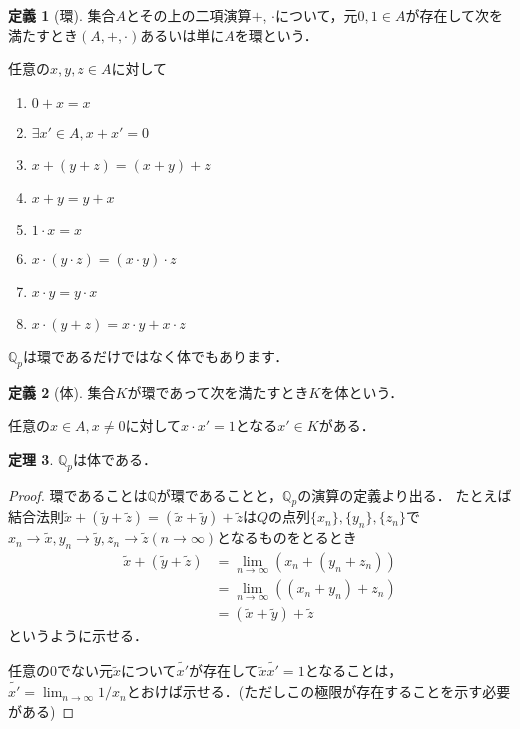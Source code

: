 \documentclass[uplatex]{jsarticle}
\newcommand{\Q}{\mathbb{Q}}
\theoremstyle{definition} %
\newtheorem{thm}{定理}
\newtheorem{defi}[thm]{定義}
\begin{document}
\begin{oframed}\begin{defi}[環]
集合$A$とその上の二項演算$+$, $\cdot$について，元$0, 1 \in A$が存在して次を満たすとき$(A, +, \cdot)$あるいは単に$A$を環という．

任意の$x, y, z \in A$に対して
\begin{enumerate}
\item $0 + x = x$
\item $\exists x'\in A, x + x' = 0$
\item $x + (y + z) = (x + y) + z$
\item $x + y = y + x$
\item $1 \cdot x = x$
\item $x \cdot (y \cdot z) = (x \cdot y) \cdot z$
\item $x \cdot y = y \cdot x$
\item $x \cdot (y + z) = x \cdot y + x \cdot z$
\end{enumerate}
\end{defi}\end{oframed}

$\Q_p$は環であるだけではなく体でもあります．

\begin{oframed}\begin{defi}[体]
集合$K$が環であって次を満たすとき$K$を体という．

任意の$x \in A, x \ne 0$に対して$x \cdot x' = 1$となる$x' \in K$がある．
\end{defi}\end{oframed}

\begin{oframed}\begin{thm}
$\Q_p$は体である．
\end{thm}\end{oframed}
\begin{proof}
環であることは$\Q$が環であることと，$\Q_p$の演算の定義より出る．
たとえば結合法則$\tilde{x} + (\tilde{y} + \tilde{z}) = (\tilde{x} + \tilde{y}) + \tilde{z}$は$Q$の点列$\{x_n\}, \{y_n\}, \{z_n\}$で$x_n \to \tilde{x}, y_n \to \tilde{y}, z_n \to \tilde{z} (n \to \infty)$となるものをとるとき
\begin{align*}
\tilde{x} + (\tilde{y} + \tilde{z}) &= \lim_{n\to\infty} (x_n + (y_n + z_n)) \\
 &= \lim_{n\to\infty} ((x_n + y_n) + z_n) \\
 &= (\tilde{x} + \tilde{y}) + \tilde{z}
\end{align*}
というように示せる．

任意の$0$でない元$\tilde{x}$について$\tilde{x'}$が存在して$\tilde{x} \tilde{x'} = 1$となることは，$\tilde{x'} = \lim_{n\to\infty}{1/x_n}$とおけば示せる．(ただしこの極限が存在することを示す必要がある)
\end{proof}
\end{document}
